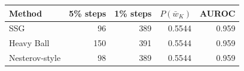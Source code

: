 \begin{tabular}{lrrrr}
\toprule
Method & 5\% steps & 1\% steps & $P(\bar w_K)$ & AUROC \\
\midrule
SSG & 96 & 389 & 0.5544 & 0.959 \\
Heavy Ball & 150 & 391 & 0.5544 & 0.959 \\
Nesterov-style & 98 & 389 & 0.5544 & 0.959 \\
\bottomrule
\end{tabular}
